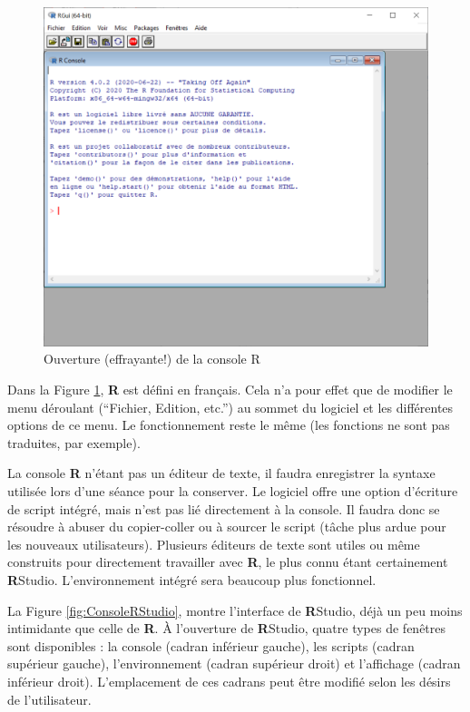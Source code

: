 \documentclass[
]{book}
\begin{document}
\begin{figure}

{\centering \includegraphics[width=0.75\linewidth]{image//ConsoleR} 

}

\caption{Ouverture (effrayante!) de la console R}\label{fig:ConsoleR}
\end{figure}

Dans la Figure \ref{fig:ConsoleR}, \textbf{R} est défini en français. Cela n'a pour effet que de modifier le menu déroulant (``Fichier, Edition, etc.'') au sommet du logiciel et les différentes options de ce menu. Le fonctionnement reste le même (les fonctions ne sont pas traduites, par exemple).

La console \textbf{R} n'étant pas un éditeur de texte, il faudra enregistrer la syntaxe utilisée lors d'une séance pour la conserver. Le logiciel offre une option d'écriture de script intégré, mais n'est pas lié directement à la console. Il faudra donc se résoudre à abuser du copier-coller ou à sourcer le script (tâche plus ardue pour les nouveaux utilisateurs). Plusieurs éditeurs de texte sont utiles ou même construits pour directement travailler avec \textbf{R}, le plus connu étant certainement \textbf{R}Studio. L'environnement intégré sera beaucoup plus fonctionnel.

La Figure \ref{fig:ConsoleRStudio}, montre l'interface de \textbf{R}Studio, déjà un peu moins intimidante que celle de \textbf{R}. À l'ouverture de \textbf{R}Studio, quatre types de fenêtres sont disponibles : la console (cadran inférieur gauche), les scripts (cadran supérieur gauche), l'environnement (cadran supérieur droit) et l'affichage (cadran inférieur droit). L'emplacement de ces cadrans peut être modifié selon les désirs de l'utilisateur.
\end{document}
